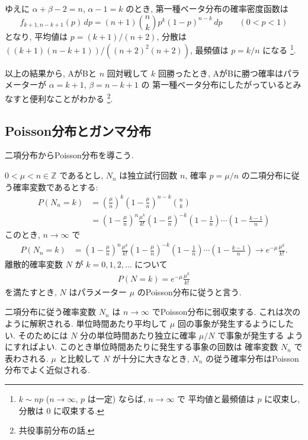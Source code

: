\documentclass[12pt,twoside]{jarticle}
\newcommand\Z{{\mathbb Z}} %
\theoremstyle{jplain}
\theoremstyle{jplain}
\theoremstyle{jplain}
\numberwithin{theorem}{section}
\numberwithin{equation}{section}
\numberwithin{figure}{section}
\numberwithin{table}{section}
\begin{document}
ゆえに $\alpha+\beta-2=n$, $\alpha-1=k$ のとき, 
第一種ベータ分布の確率密度函数は
\[
f_{k+1,n-k+1}(p)\,dp
=(n+1)\binom{n}{k} p^k(1-p)^{n-k}\,dp
\qquad (0<p<1)
\]
となり, 平均値は $p=(k+1)/(n+2)$, 分散は $((k+1)(n-k+1))/((n+2)^2(n+2))$, 
最頻値は $p=k/n$ になる%
\footnote{$k\sim np$ ($n\to\infty$, $p$ は一定) ならば, $n\to\infty$ で
平均値と最頻値は $p$ に収束し, 分散は $0$ に収束する.}.

以上の結果から, AがBと $n$ 回対戦して $k$ 回勝ったとき, 
AがBに勝つ確率はパラメーターが $\alpha=k+1$, $\beta=n-k+1$ の
第一種ベータ分布にしたがっているとみなすと便利なことがわかる%
\footnote{共役事前分布の話.}.


\subsection{Poisson分布とガンマ分布}
\label{sec:Poisson-Gamma}

二項分布からPoisson分布を導こう.

$0<\mu<n\in\Z$ であるとし, 
$N_n$ は独立試行回数 $n$, 確率 $p=\mu/n$ の二項分布に従う確率変数であるとする:
\begin{align*}
P(N_n=k)
&= \left(\frac{\mu}{n}\right)^k \left(1-\frac{\mu}{n}\right)^{n-k} \binom{n}{k}
\\ &
= \left(1-\frac{\mu}{n}\right)^n \frac{\mu^k}{k!}
\left(1-\frac{\mu}{n}\right)^{-k} \left(1-\frac{1}{n}\right)\cdots\left(1-\frac{k-1}{n}\right)
\end{align*}
このとき, $n\to\infty$ で
\begin{align*}
P(N_n=k)
&
= \left(1-\frac{\mu}{n}\right)^n \frac{\mu^k}{k!}
\left(1-\frac{\mu}{n}\right)^{-k} \left(1-\frac{1}{n}\right)\cdots\left(1-\frac{k-1}{n}\right)
\longrightarrow
e^{-\mu}\frac{\mu^k}{k!}.
\end{align*} 
離散的確率変数 $N$ が $k=0,1,2,\ldots$ について
\begin{align*}
P(N=k) = e^{-\mu}\frac{\mu^k}{k!}
\end{align*}
を満たすとき, $N$ はパラメーター $\mu$ のPoisson分布に従うと言う.

二項分布に従う確率変数 $N_n$ は $n\to\infty$ でPoisson分布に弱収束する.
これは次のように解釈される.
単位時間あたり平均して $\mu$ 回の事象が発生するようにしたい.
そのためには $N$ 分の単位時間あたり独立に確率 $\mu/N$ で事象が発生する
ようにすればよい. このとき単位時間あたりに発生する事象の回数は
確率変数 $N_n$ で表わされる.
$\mu$ と比較して $N$ が十分に大きなとき, 
$N_n$ の従う確率分布はPoisson分布でよく近似される.
\end{document}
